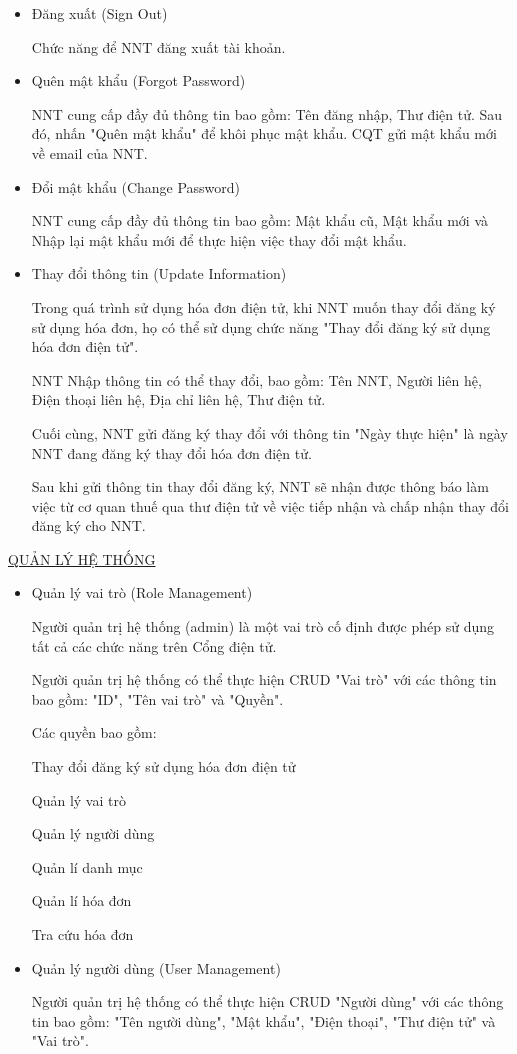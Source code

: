 \begin{itemize}
\item Đăng xuất (Sign Out)

Chức năng để NNT đăng xuất tài khoản.

\item Quên mật khẩu (Forgot Password)

NNT cung cấp đầy đủ thông tin bao gồm: Tên đăng nhập, Thư điện tử. Sau đó, nhấn "Quên mật khẩu" để khôi phục mật khẩu. CQT gửi mật khẩu mới về email của NNT.

\item Đổi mật khẩu (Change Password)

NNT cung cấp đầy đủ thông tin bao gồm: Mật khẩu cũ, Mật khẩu mới và Nhập lại mật khẩu mới để thực hiện việc thay đổi mật khẩu.

\item Thay đổi thông tin (Update Information)

Trong quá trình sử dụng hóa đơn điện tử, khi NNT muốn thay đổi đăng ký sử dụng hóa đơn, họ có thể sử dụng chức năng "Thay đổi đăng ký sử dụng hóa đơn điện tử".

NNT Nhập thông tin có thể thay đổi, bao gồm: Tên NNT, Người liên hệ, Điện thoại liên hệ, Địa chỉ liên hệ, Thư điện tử.

Cuối cùng, NNT gửi đăng ký thay đổi với thông tin "Ngày thực hiện" là ngày NNT đang đăng ký thay đổi hóa đơn điện tử.

Sau khi gửi thông tin thay đổi đăng ký, NNT sẽ nhận được thông báo làm việc từ cơ quan thuế qua thư điện tử về việc tiếp nhận và chấp nhận thay đổi đăng ký cho NNT.

\end{itemize}

\item \underline{QUẢN LÝ HỆ THỐNG}

\begin{itemize}

\item Quản lý vai trò (Role Management)

Người quản trị hệ thống (admin) là một vai trò cố định được phép sử dụng tất cả các chức năng trên Cổng điện tử.

Người quản trị hệ thống có thể thực hiện CRUD "Vai trò" với các thông tin bao gồm: "ID", "Tên vai trò" và "Quyền".

Các quyền bao gồm:

Thay đổi đăng ký sử dụng hóa đơn điện tử

Quản lý vai trò

Quản lý người dùng

Quản lí danh mục

Quản lí hóa đơn

Tra cứu hóa đơn

\item Quản lý người dùng (User Management)

Người quản trị hệ thống có thể thực hiện CRUD "Người dùng" với các thông tin bao gồm: "Tên người dùng", "Mật khẩu", "Điện thoại", "Thư điện tử" và "Vai trò".

\end{itemize}

